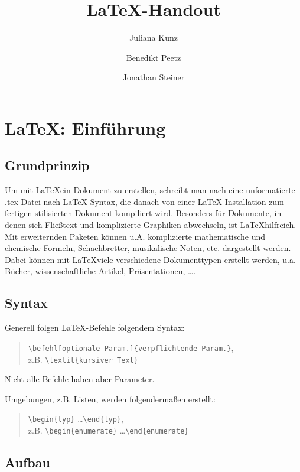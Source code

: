 \documentclass[ngerman]{scrreport}
\title{\LaTeX{}-Handout}
\author{Juliana Kunz \and Benedikt Peetz \and Jonathan Steiner}
\date{}
\begin{document}
\maketitle

\tableofcontents

\chapter{\centering\LaTeX: Einführung}

\section{Grundprinzip}

Um mit \LaTeX ein Dokument zu erstellen, schreibt man nach eine unformatierte .tex-Datei nach \LaTeX-Syntax, die danach von einer \LaTeX-Installation zum fertigen stilisierten Dokument kompiliert wird. 
Besonders für Dokumente, in denen sich Fließtext und komplizierte Graphiken abwechseln, ist \LaTeX hilfreich. Mit erweiternden Paketen können u.A. komplizierte mathematische und chemische Formeln, Schachbretter, musikalische Noten, etc. dargestellt werden.
Dabei können mit \LaTeX viele verschiedene Dokumenttypen erstellt werden, u.a. Bücher, wissenschaftliche Artikel, Präsentationen, \dots. 

\section{Syntax}

Generell folgen \LaTeX-Befehle folgendem Syntax:

\begin{quote}
    \verb|\befehl[optionale Param.]{verpflichtende Param.}|, \\z.B. \verb|\textit{kursiver Text}|
\end{quote}
Nicht alle Befehle haben aber Parameter.

Umgebungen, z.B. Listen, werden folgendermaßen erstellt:

\begin{quote}
    \verb|\begin{typ}| \dots \verb|\end{typ}|, \\z.B. \verb|\begin{enumerate}| \dots \verb|\end{enumerate}|
\end{quote}

\section{Aufbau}
\end{document}
